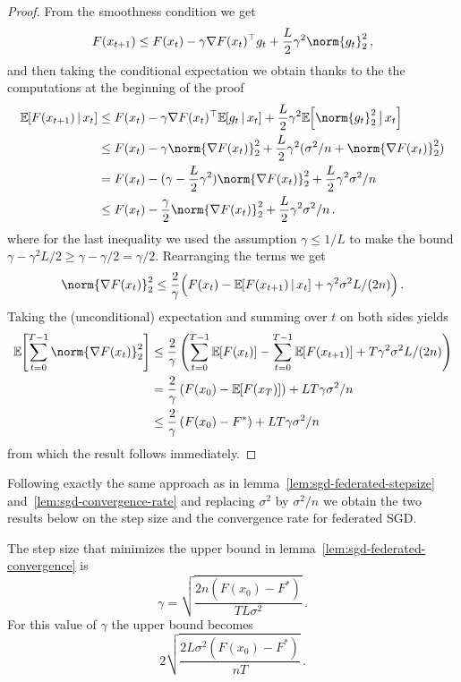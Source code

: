 \documentclass{article}
\begin{document}
\begin{proof}
  From the smoothness condition we get
  \[
    F(x_{t+1}) \leq F(x_t) - \gamma \nabla F(x_t)^\top g_t + \frac{L}{2} \gamma^2 \norm{g_t}_2^2
    \, ,
  \]
  and then taking the conditional expectation we obtain thanks to the the computations at the beginning of the proof
  \begin{align*}
    \expec{F(x_{t+1})  \,|\, x_t}
     & \leq
    F(x_t) - \gamma \nabla F(x_t)^\top \expec{g_t \,|\, x_t} + \frac{L}{2} \gamma^2 \expec{\norm{g_t}_2^2 \,\big|\, x_t}
    \\
     & \leq
    F(x_t) - \gamma \norm{\nabla F(x_t)}_2^2 + \frac{L}{2} \gamma^2  (\sigma^2/n + \norm{\nabla F(x_t)}_2^2)
    \\
     & =
    F(x_t) - (\gamma - \frac{L}{2} \gamma^2) \norm{\nabla F(x_t)}_2^2 + \frac{L}{2} \gamma^2  \sigma^2/n
    \\
     & \leq
    F(x_t) - \frac{\gamma}{2} \norm{\nabla F(x_t)}_2^2 + \frac{L}{2} \gamma^2  \sigma^2/n
    \, .
  \end{align*}
  where for the last inequality we used the assumption $\gamma \leq 1/L$ to make the bound $\gamma - \gamma^2 L/2 \geq \gamma - \gamma/2 = \gamma/2$.
  Rearranging the terms we get
  \[
    \norm{\nabla F(x_t)}_2^2
    \leq
    \frac{2}{\gamma} \Bigl(F(x_t) - \expec{F(x_{t+1}) \,|\, x_t}  + \gamma^2 \sigma^2 L/(2n) \Bigr)
    \, .
  \]
  Taking the (unconditional) expectation and summing over $t$ on both sides yields
  \begin{align*}
    \expec{ \sum_{t=0}^{T-1} \norm{\nabla F(x_t)}_2^2 }
     & \leq
    \frac{2}{\gamma} \left(\sum_{t=0}^{T-1} \expec{F(x_t)} - \sum_{t=0}^{T-1} \expec{F(x_{t+1})} + T \gamma^2 \sigma^2 L/(2n) \right)
    \\
     & =
    \frac{2}{\gamma}  \left(F(x_0) - \expec{F(x_{T})}\right) + L T \gamma \sigma^2/n
    \\
     & \leq
    \frac{2}{\gamma}  \left(F(x_0) - F^\ast\right) + L T \gamma \sigma^2/n
  \end{align*}
  from which the result follows immediately.
\end{proof}


Following exactly the same approach as in lemma~\ref{lem:sgd-federated-stepsize} and~\ref{lem:sgd-convergence-rate} and replacing $\sigma^2$ by $\sigma^2/n$ we obtain the two results below on the step size and the convergence rate for federated SGD.


\begin{lemma}\label{lem:sgd-federated-stepsize}
  The step size that minimizes the upper bound in lemma~\ref{lem:sgd-federated-convergence}
  is
  \[
    \gamma = \sqrt{\frac{2n(F(x_0) - F^\ast)}{T L \sigma^2}}
    \, .
  \]
  For this value of $\gamma$ the upper bound becomes
  \[
    2 \sqrt{\frac{2L \sigma^2 (F(x_0) - F^\ast)}{nT}}
    \, .
  \]
\end{lemma}
\end{document}
